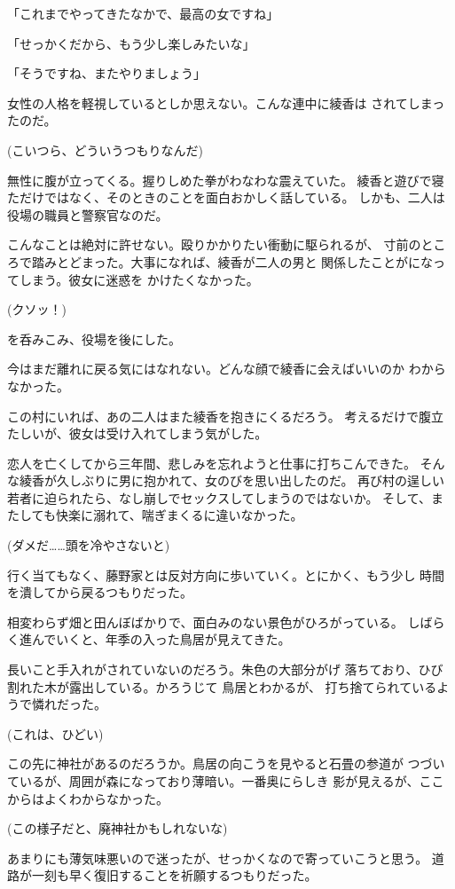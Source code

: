 ﻿\documentclass[
    book,tate,
    line_length=30zw,
    jafontsize=12pt,
    paper=b5j,
    landscape,
    ]{jlreq}
\begin{document}
「これまでやってきたなかで、最高の女ですね」

「せっかくだから、もう少し楽しみたいな」

「そうですね、またやりましょう」

女性の人格を軽視しているとしか思えない。こんな連中に綾香は
されてしまったのだ。

(こいつら、どういうつもりなんだ)

無性に腹が立ってくる。握りしめた拳がわなわな震えていた。
綾香と遊びで寝ただけではなく、そのときのことを面白おかしく話している。
しかも、二人は役場の職員と警察官なのだ。

こんなことは絶対に許せない。殴りかかりたい衝動に駆られるが、
寸前のところで踏みとどまった。大事になれば、綾香が二人の男と
関係したことがになってしまう。彼女に迷惑を
かけたくなかった。

(クソッ！)

を呑みこみ、役場を後にした。

今はまだ離れに戻る気にはなれない。どんな顔で綾香に会えばいいのか
わからなかった。

この村にいれば、あの二人はまた綾香を抱きにくるだろう。
考えるだけで腹立たしいが、彼女は受け入れてしまう気がした。

恋人を亡くしてから三年間、悲しみを忘れようと仕事に打ちこんできた。
そんな綾香が久しぶりに男に抱かれて、女のびを思い出したのだ。
再び村の逞しい若者に迫られたら、なし崩しでセックスしてしまうのではないか。
そして、またしても快楽に溺れて、喘ぎまくるに違いなかった。

(ダメだ……頭を冷やさないと)

行く当てもなく、藤野家とは反対方向に歩いていく。とにかく、もう少し
時間を潰してから戻るつもりだった。

相変わらず畑と田んぼばかりで、面白みのない景色がひろがっている。
しばらく進んでいくと、年季の入った鳥居が見えてきた。

長いこと手入れがされていないのだろう。朱色の大部分がげ
落ちており、ひび割れた木が露出している。かろうじて 鳥居とわかるが、
打ち捨てられているようで憐れだった。

(これは、ひどい)

この先に神社があるのだろうか。鳥居の向こうを見やると石畳の参道が
つづいているが、周囲が森になっており薄暗い。一番奥にらしき
影が見えるが、ここからはよくわからなかった。

(この様子だと、廃神社かもしれないな)

あまりにも薄気味悪いので迷ったが、せっかくなので寄っていこうと思う。
道路が一刻も早く復旧することを祈願するつもりだった。
\end{document}
